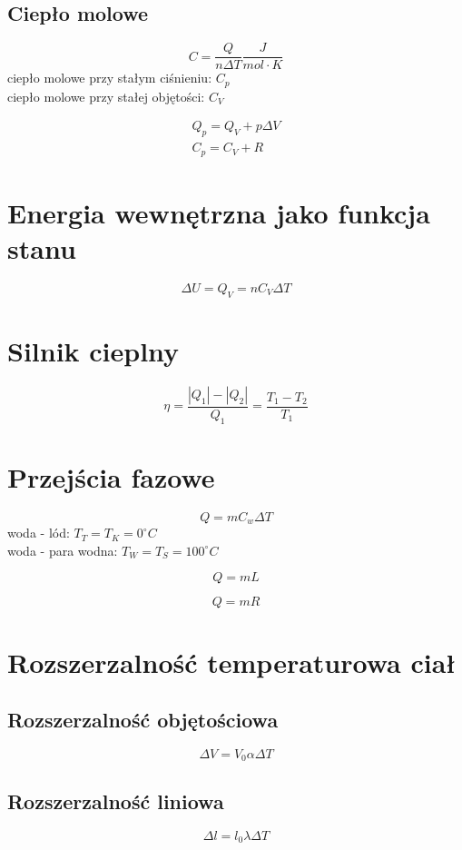\subsection{Ciepło molowe}
\begin{equation*}
  C = \frac{Q}{n \Delta T} \unit{\frac{J}{mol \cdot K}}
\end{equation*}
ciepło molowe przy stałym ciśnieniu: $C_p$\\
ciepło molowe przy stałej objętości: $C_V$

\begin{gather*}
  Q_p = Q_V + p \Delta V\\
  C_p = C_V + R
\end{gather*}

\section{Energia wewnętrzna jako funkcja stanu}
\begin{equation}
  \Delta U = Q_V = n C_V \Delta T
\end{equation}

\section{Silnik cieplny}
\begin{equation*}
  \eta = \frac{|Q_1|-|Q_2|}{Q_1} = \frac{T_1 - T_2}{T_1}
\end{equation*}

\section{Przejścia fazowe}
\begin{equation*}
  Q = m C_w \Delta T
\end{equation*}
woda - lód: $T_T = T_K = 0^\circ C$\\
woda - para wodna: $T_W = T_S = 100^\circ C$

\begin{equation*}
  Q = mL
\end{equation*}

\begin{equation*}
  Q = mR
\end{equation*}

\section{Rozszerzalność temperaturowa ciał}

\subsection{Rozszerzalność objętościowa}
\begin{equation*}
  \Delta V = V_0 \alpha \Delta T
\end{equation*}

\subsection{Rozszerzalność liniowa}
\begin{equation*}
  \Delta l = l_0 \lambda \Delta T
\end{equation*}

